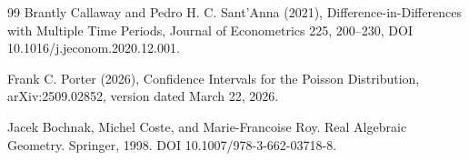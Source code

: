 \documentclass{article}
\begin{document}
\begin{thebibliography}{99}
   Brantly Callaway and Pedro H. C. Sant'Anna (2021), Difference-in-Differences with Multiple Time Periods, Journal of Econometrics 225, 200--230, DOI 10.1016/j.jeconom.2020.12.001.

   Frank C. Porter (2026), Confidence Intervals for the Poisson Distribution, arXiv:2509.02852, version dated March 22, 2026.

   Jacek Bochnak, Michel Coste, and Marie-Francoise Roy. Real Algebraic Geometry. Springer, 1998. DOI 10.1007/978-3-662-03718-8.

\end{thebibliography}
\end{document}
